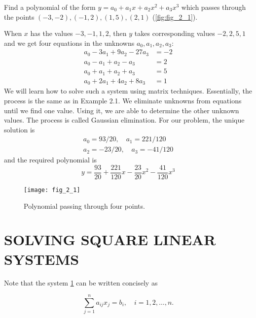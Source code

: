 \documentclass[../main.tex]{subfiles}
\begin{document}
\begin{example} Find a polynomial of the form $y=a_{0}+a_{1} x+a_{2} x^{2}+a_{3} x^{3}$ which passes through the points $(-3,-2),(-1,2),(1,5),(2,1)$ (\autoref{fig:fig_2_1}).

When $x$ has the values $-3,-1,1,2$, then $y$ takes corresponding values $-2,2,5,1$ and we get four equations in the unknowns $a_{0}, a_{1}, a_{2}, a_{3}:$
$$
\begin{aligned}
a_{0}-3 a_{1}+9 a_{2}-27 a_{3} &=-2 \\
a_{0}-a_{1}+a_{2}-a_{3} &=2 \\
a_{0}+a_{1}+a_{2}+a_{3} &=5 \\
a_{0}+2 a_{1}+4 a_{2}+8 a_{3} &=1
\end{aligned}
$$
We will learn how to solve such a system using matrix techniques. Essentially, the process is the same as in Example 2.1. We eliminate unknowns from equations until we find one value. Using it, we are able to determine the other unknown values. The process is called Gaussian elimination. For our problem, the unique solution is
$$
\begin{aligned}
a_{0}=93 / 20, \quad a_{1}=221 / 120 \\
a_{2}=-23 / 20, \quad a_{3}=-41 / 120
\end{aligned}$$
and the required polynomial is
$$y=\frac{93}{20}+\frac{221}{120} x-\frac{23}{20} x^{2}-\frac{41}{120} x^{3}$$
\end{example}

\begin{figure}
	\centering
	\texttt{[image: fig\_2\_1]}
	\caption{ Polynomial passing through four points.}
	\label{fig:fig_2_1}
\end{figure}

\section[Solving Square Linear Systems]{SOLVING SQUARE LINEAR SYSTEMS}
Note that the system \ref{fig:fig_2_1} can be written concisely as

\begin{equation}
	\sum_{j=1}^{n} a_{i j} x_{j}=b_{i}, \quad i=1,2, \ldots, n .
\end{equation}
\end{document}
